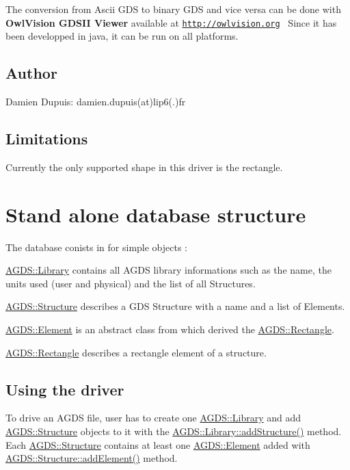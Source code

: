 The conversion from Ascii G\+DS to binary G\+DS and vice versa can be done with {\bfseries Owl\+Vision G\+D\+S\+II Viewer} available at \href{http://owlvision.org}{\tt http\+://owlvision.\+org}~\newline
Since it has been developped in java, it can be run on all platforms.\hypertarget{agds_agdsAutrhos}{}\subsection{Author}\label{agds_agdsAutrhos}
Damien Dupuis\+: damien.\+dupuis(at)lip6(.)fr\hypertarget{agds_agdsLimits}{}\subsection{Limitations}\label{agds_agdsLimits}
Currently the only supported shape in this driver is the rectangle.\hypertarget{agds_agdsDB}{}\section{Stand alone database structure}\label{agds_agdsDB}
The database conists in for simple objects \+:
\begin{DoxyItemize}
\item \hyperlink{class_a_g_d_s_1_1_library}{A\+G\+D\+S\+::\+Library} contains all A\+G\+DS library informations such as the name, the units used (user and physical) and the list of all Structures.
\item \hyperlink{class_a_g_d_s_1_1_structure}{A\+G\+D\+S\+::\+Structure} describes a G\+DS Structure with a name and a list of Elements.
\item \hyperlink{class_a_g_d_s_1_1_element}{A\+G\+D\+S\+::\+Element} is an abstract class from which derived the \hyperlink{class_a_g_d_s_1_1_rectangle}{A\+G\+D\+S\+::\+Rectangle}.
\item \hyperlink{class_a_g_d_s_1_1_rectangle}{A\+G\+D\+S\+::\+Rectangle} describes a rectangle element of a structure.
\end{DoxyItemize}\hypertarget{agds_agdsDriver}{}\subsection{Using the driver}\label{agds_agdsDriver}
To drive an A\+G\+DS file, user has to create one \hyperlink{class_a_g_d_s_1_1_library}{A\+G\+D\+S\+::\+Library} and add \hyperlink{class_a_g_d_s_1_1_structure}{A\+G\+D\+S\+::\+Structure} objects to it with the \hyperlink{class_a_g_d_s_1_1_library_a93d333a20154e0b688ff3ff213039171}{A\+G\+D\+S\+::\+Library\+::add\+Structure()} method. Each \hyperlink{class_a_g_d_s_1_1_structure}{A\+G\+D\+S\+::\+Structure} contains at least one \hyperlink{class_a_g_d_s_1_1_element}{A\+G\+D\+S\+::\+Element} added with \hyperlink{class_a_g_d_s_1_1_structure_a2dd203e6770f7d15d6f706867c919a60}{A\+G\+D\+S\+::\+Structure\+::add\+Element()} method.~\newline
